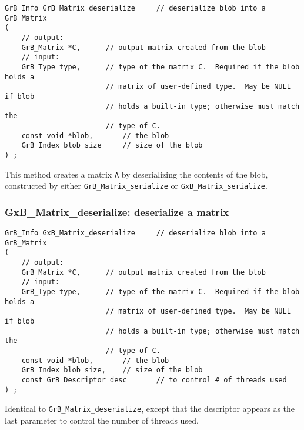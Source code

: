 \documentclass[12pt]{article}
\begin{document}
\begin{mdframed}[userdefinedwidth=6in]
{\footnotesize
\begin{verbatim}
GrB_Info GrB_Matrix_deserialize     // deserialize blob into a GrB_Matrix
(
    // output:
    GrB_Matrix *C,      // output matrix created from the blob
    // input:
    GrB_Type type,      // type of the matrix C.  Required if the blob holds a
                        // matrix of user-defined type.  May be NULL if blob
                        // holds a built-in type; otherwise must match the
                        // type of C.
    const void *blob,       // the blob
    GrB_Index blob_size     // size of the blob
) ;
\end{verbatim}
} \end{mdframed}

This method creates a matrix \verb'A' by deserializing the contents of the
blob, constructed by either \verb'GrB_Matrix_serialize' or
\verb'GxB_Matrix_serialize'.

\newpage
\subsubsection{{\sf GxB\_Matrix\_deserialize:}    deserialize a matrix}
\label{matrix_deserialize_GxB}

\begin{mdframed}[userdefinedwidth=6in]
{\footnotesize
\begin{verbatim}
GrB_Info GxB_Matrix_deserialize     // deserialize blob into a GrB_Matrix
(
    // output:
    GrB_Matrix *C,      // output matrix created from the blob
    // input:
    GrB_Type type,      // type of the matrix C.  Required if the blob holds a
                        // matrix of user-defined type.  May be NULL if blob
                        // holds a built-in type; otherwise must match the
                        // type of C.
    const void *blob,       // the blob
    GrB_Index blob_size,    // size of the blob
    const GrB_Descriptor desc       // to control # of threads used
) ;
\end{verbatim}
} \end{mdframed}

Identical to \verb'GrB_Matrix_deserialize', except that the descriptor
appears as the last parameter to control the number of threads used.

\end{document}
